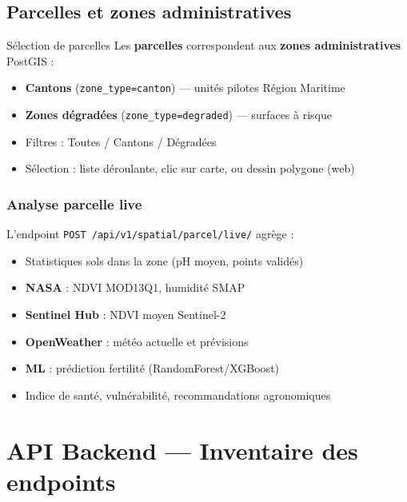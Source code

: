 \documentclass[11pt,a4paper]{report}
\begin{document}
\section{Parcelles et zones administratives}

\begin{infobox}{Sélection de parcelles}
Les \textbf{parcelles} correspondent aux \textbf{zones administratives} PostGIS :
\begin{itemize}
  \item \textbf{Cantons} (\texttt{zone\_type=canton}) — unités pilotes Région Maritime
  \item \textbf{Zones dégradées} (\texttt{zone\_type=degraded}) — surfaces à risque
  \item Filtres : Toutes / Cantons / Dégradées
  \item Sélection : liste déroulante, clic sur carte, ou dessin polygone (web)
\end{itemize}
\end{infobox}

\subsection{Analyse parcelle live}
L'endpoint \texttt{POST /api/v1/spatial/parcel/live/} agrège :
\begin{itemize}
  \item Statistiques sols dans la zone (pH moyen, points validés)
  \item \textbf{NASA} : NDVI MOD13Q1, humidité SMAP
  \item \textbf{Sentinel Hub} : NDVI moyen Sentinel-2
  \item \textbf{OpenWeather} : météo actuelle et prévisions
  \item \textbf{ML} : prédiction fertilité (RandomForest/XGBoost)
  \item Indice de santé, vulnérabilité, recommandations agronomiques
\end{itemize}

\chapter{API Backend — Inventaire des endpoints}
\end{document}
